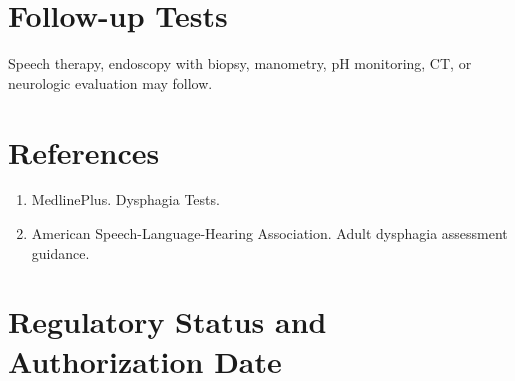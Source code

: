 \section*{Follow-up Tests} Speech therapy, endoscopy with biopsy, manometry, pH monitoring, CT, or neurologic evaluation may follow.
\section*{References} \begin{enumerate}\item MedlinePlus. Dysphagia Tests.\item American Speech-Language-Hearing Association. Adult dysphagia assessment guidance.\end{enumerate}
\clearpage\section*{Regulatory Status and Authorization Date}\clearpage
